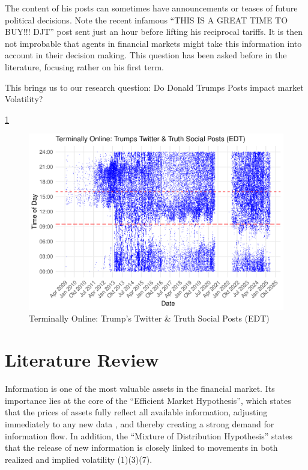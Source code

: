 \documentclass[
]{book}
\begin{document}
The content of his posts can sometimes have announcements or teases of future
political decisions. Note the recent infamous ``THIS IS A GREAT TIME TO BUY!!! DJT''
post sent just an hour before lifting his reciprocal tariffs. It is then not
improbable that agents in financial markets might take this information into
account in their decision making. This question has been asked before in the
literature, focusing rather on his first term.

This brings us to our research question: Do Donald Trumps Posts impact market Volatility?

\ref{fig:fig1}

\begin{figure}
\centering
\includegraphics{_main_files/figure-latex/fig1-1.pdf}
\caption{\label{fig:fig1}Terminally Online: Trump's Twitter \& Truth Social Posts (EDT)}
\end{figure}

\section{Literature Review}\label{literature-review}

Information is one of the most valuable assets in the financial market.
Its importance lies at the core of the ``Efficient Market Hypothesis'',
which states that the prices of assets fully reflect all
available information, adjusting immediately to any new data
\citet{famaAdjustmentStockPrices2003} , and thereby creating a strong demand
for information flow. In addition, the ``Mixture of Distribution
Hypothesis'' states that the release of new information is closely linked
to movements in both realized and implied volatility (1)(3)(7).
\end{document}
